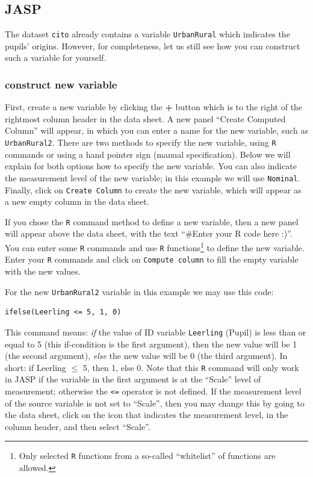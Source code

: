\documentclass[
]{book}
\begin{document}
\hypertarget{jasp-9}{%
\subsection{JASP}\label{jasp-9}}

The dataset \texttt{cito} already contains a variable \texttt{UrbanRural} which indicates the pupils' origins.
However, for completeness, let us still see how you can construct such a variable for yourself.

\hypertarget{construct-new-variable-1}{%
\subsubsection{construct new variable}\label{construct-new-variable-1}}

First, create a new variable by clicking the \textbf{+} button which is to the right of the rightmost column header in the data sheet. A new panel ``Create Computed Column'' will appear, in which you can enter a name for the new variable, such as \texttt{UrbanRural2}.
There are two methods to specify the new variable, using \texttt{R} commands or using a hand pointer sign (manual specification). Below we will explain for both options how to specify the new variable. You can also indicate the measurement level of the new variable; in this example we will use \texttt{Nominal}. Finally, click on \texttt{Create\ Column} to create the new variable, which will appear as a new empty column in the data sheet.

If you chose the \texttt{R} command method to define a new variable, then a new panel will appear above the data sheet, with the text ``\#Enter your R code here :)''. You can enter some \texttt{R} commands and use \texttt{R} functions\footnote{Only selected \texttt{R} functions from a so-called ``whitelist'' of functions are allowed.} to define the new variable. Enter your \texttt{R} commands and click on \texttt{Compute\ column} to fill the empty variable with the new values.

For the new \texttt{UrbanRural2} variable in this example we may use this code:

\begin{verbatim}
ifelse(Leerling <= 5, 1, 0) 
\end{verbatim}

This command means: \emph{if} the value of ID variable \texttt{Leerling} (Pupil) is less than or equal to 5 (this if-condition is the first argument), then the new value will be 1 (the second argument), \emph{else} the new value will be 0 (the third argument). In short: if Leerling \(\leq\) 5, then 1, else 0.
Note that this \texttt{R} command will only work in JASP if the variable in the first argument is at the ``Scale'' level of measurement; otherwise the \texttt{\textless{}=} operator is not defined. If the measurement level of the source variable is not set to ``Scale'', then you may change this by going to the data sheet, click on the icon that indicates the measurement level, in the column header, and then select ``Scale''.
\end{document}
